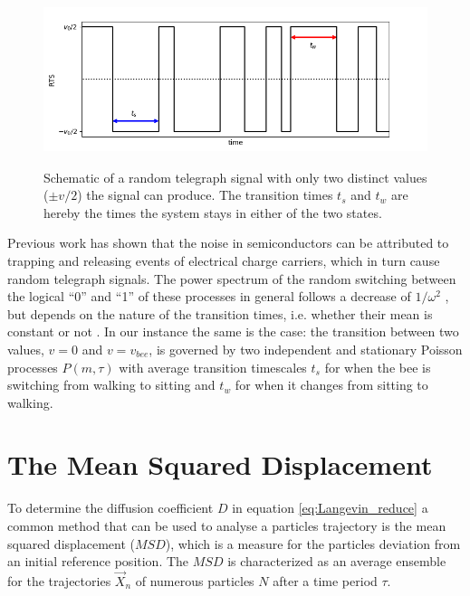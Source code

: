 \begin{figure}[H]
    \centering
        \includegraphics[width=12cm, height=5cm]{figures/2021_12_02_RTS_schematic_RTS.png}
    \caption{Schematic of a random telegraph signal with only two distinct values ($\pm v/2$) the signal can produce. The transition times $t_{s}$ and $t_{w}$ are hereby the times the system stays in either of the two states.}
    \label{fig:RTS_schematic}
\end{figure}


Previous work has shown that the noise in semiconductors can be attributed to trapping and releasing events of electrical charge carriers, which in turn cause random telegraph signals.  \cite{Guerrero2010} \cite{Leyris2006} \cite{Xiong2007} \cite{Machlup1954}
The power spectrum of the random switching between the logical ``0'' and ``1'' of these processes in general follows a decrease of $1/\omega^{2}$ \cite{Milstein2009} \cite{Puglisi2016}, but depends on the nature of the transition times, i.e. whether their mean is constant or not \cite{Machlup1954}.
In our instance the same is the case: the transition between two values, $v = 0$ and $v = v_{bee}$, is governed by two independent and stationary Poisson processes $P(m, \tau)$ with average transition timescales $t_{s}$ for when the bee is switching from walking to sitting and $t_{w}$ for when it changes from sitting to walking. 

\section{The Mean Squared Displacement}
\label{sec:MSD}

To determine the diffusion coefficient $D$ in equation \ref{eq:Langevin_reduce} a common method that can be used to analyse a particles trajectory is the mean squared displacement ($MSD$), which is a measure for the particles deviation from an initial reference position.
The $MSD$ is characterized as an average ensemble for the trajectories $\vec{X}_n$ of numerous particles $N$ after a time period $\tau$.

